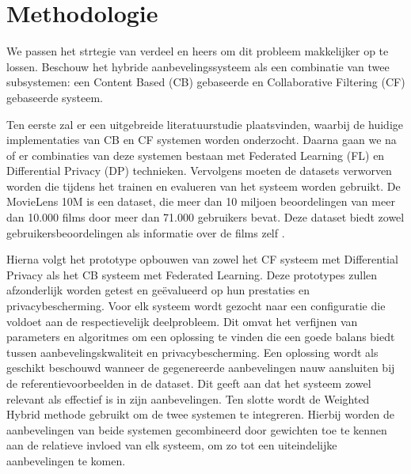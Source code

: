 

\section{Methodologie}%
\label{sec:methodologie}

We passen het strtegie van verdeel en heers om dit probleem makkelijker op te lossen. Beschouw het hybride aanbevelingssysteem als een combinatie van twee subsystemen: een Content Based (CB) gebaseerde en Collaborative Filtering (CF) gebaseerde systeem. 

Ten eerste zal er een uitgebreide literatuurstudie plaatsvinden, waarbij de huidige implementaties van CB en CF systemen worden onderzocht. Daarna gaan we na of er combinaties van deze systemen bestaan met Federated Learning (FL) en Differential Privacy (DP) technieken.
Vervolgens moeten de datasets verworven worden die tijdens het trainen en evalueren van het systeem worden gebruikt. De MovieLens 10M is een dataset, die meer dan 10 miljoen beoordelingen van meer dan 10.000 films door meer dan 71.000 gebruikers bevat. Deze dataset biedt zowel gebruikersbeoordelingen als informatie over de films zelf \autocite{Mazeh2020}.

Hierna volgt het prototype opbouwen van zowel het CF systeem met Differential Privacy als het CB systeem met Federated Learning. Deze prototypes zullen afzonderlijk worden getest en geëvalueerd op hun prestaties en privacybescherming. Voor elk systeem wordt gezocht naar een configuratie die voldoet aan de respectievelijk deelprobleem. Dit omvat het verfijnen van parameters en algoritmes om een oplossing te vinden die een goede balans biedt tussen aanbevelingskwaliteit en privacybescherming. Een oplossing wordt als geschikt beschouwd wanneer de gegenereerde aanbevelingen nauw aansluiten bij de referentievoorbeelden in de dataset. Dit geeft aan dat het systeem zowel relevant als effectief is in zijn aanbevelingen. Ten slotte wordt de Weighted Hybrid methode gebruikt om de twee systemen te integreren. Hierbij worden de aanbevelingen van beide systemen gecombineerd door gewichten toe te kennen aan de relatieve invloed van elk systeem, om zo tot een uiteindelijke aanbevelingen te komen.

